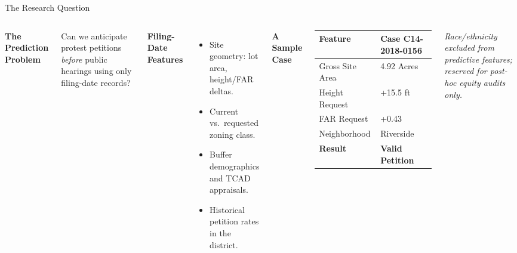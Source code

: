 \documentclass[10pt, aspectratio=169]{beamer}
\begin{document}
\begin{frame}{The Research Question}
 \begin{columns}
 \textbf{The Prediction Problem}
 \vspace{0.5em}

 {\large Can we anticipate protest petitions \textit{before} public hearings using only filing-date records?}

 \vspace{1.2em}
 \textbf{Filing-Date Features}
 \begin{itemize}
 \item Site geometry: lot area, height/FAR deltas.
 \item Current vs.\ requested zoning class.
 \item Buffer demographics and TCAD appraisals.
 \item Historical petition rates in the district.
 \end{itemize}

 \textbf{A Sample Case}
 \vspace{1em}
 {\footnotesize
 \begin{tabular}{ll}
 \toprule
 Feature & Case C14-2018-0156 \\
 \midrule
 Gross Site Area & 4.92 Acres \\
 Height Request & +15.5 ft \\
 FAR Request & +0.43 \\
 Neighborhood & Riverside \\
 \textbf{Result} & \textbf{Valid Petition} \\
 \bottomrule
 \end{tabular}
 }
 \vspace{1em}

 \small \textit{Race/ethnicity excluded from predictive features; reserved for post-hoc equity audits only.}
 \end{columns}
\end{frame}
\end{document}
